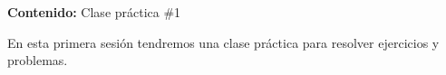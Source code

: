 {\large\textbf{Contenido:} Clase práctica \#1}

En esta primera sesión tendremos una clase práctica para resolver ejercicios y problemas.